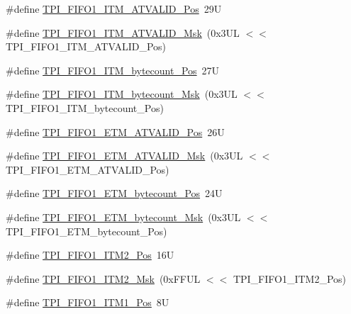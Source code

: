 \begin{DoxyCompactItemize}
\item 
\#define \mbox{\hyperlink{group___c_m_s_i_s___t_p_i_ga08edfc862b2c8c415854cc4ae2067dfb}{T\+P\+I\+\_\+\+F\+I\+F\+O1\+\_\+\+I\+T\+M\+\_\+\+A\+T\+V\+A\+L\+I\+D\+\_\+\+Pos}}~29U
\item 
\#define \mbox{\hyperlink{group___c_m_s_i_s___t_p_i_gabc1f6a3b6cac0099d7c01ca949b4dd08}{T\+P\+I\+\_\+\+F\+I\+F\+O1\+\_\+\+I\+T\+M\+\_\+\+A\+T\+V\+A\+L\+I\+D\+\_\+\+Msk}}~(0x3\+U\+L $<$$<$ T\+P\+I\+\_\+\+F\+I\+F\+O1\+\_\+\+I\+T\+M\+\_\+\+A\+T\+V\+A\+L\+I\+D\+\_\+\+Pos)
\item 
\#define \mbox{\hyperlink{group___c_m_s_i_s___t_p_i_gaa22ebf7c86e4f4b2c98cfd0b5981375a}{T\+P\+I\+\_\+\+F\+I\+F\+O1\+\_\+\+I\+T\+M\+\_\+bytecount\+\_\+\+Pos}}~27U
\item 
\#define \mbox{\hyperlink{group___c_m_s_i_s___t_p_i_gacba2edfc0499828019550141356b0dcb}{T\+P\+I\+\_\+\+F\+I\+F\+O1\+\_\+\+I\+T\+M\+\_\+bytecount\+\_\+\+Msk}}~(0x3\+U\+L $<$$<$ T\+P\+I\+\_\+\+F\+I\+F\+O1\+\_\+\+I\+T\+M\+\_\+bytecount\+\_\+\+Pos)
\item 
\#define \mbox{\hyperlink{group___c_m_s_i_s___t_p_i_ga3177b8d815cf4a707a2d3d3d5499315d}{T\+P\+I\+\_\+\+F\+I\+F\+O1\+\_\+\+E\+T\+M\+\_\+\+A\+T\+V\+A\+L\+I\+D\+\_\+\+Pos}}~26U
\item 
\#define \mbox{\hyperlink{group___c_m_s_i_s___t_p_i_ga0e8f29a1e9378d1ceb0708035edbb86d}{T\+P\+I\+\_\+\+F\+I\+F\+O1\+\_\+\+E\+T\+M\+\_\+\+A\+T\+V\+A\+L\+I\+D\+\_\+\+Msk}}~(0x3\+U\+L $<$$<$ T\+P\+I\+\_\+\+F\+I\+F\+O1\+\_\+\+E\+T\+M\+\_\+\+A\+T\+V\+A\+L\+I\+D\+\_\+\+Pos)
\item 
\#define \mbox{\hyperlink{group___c_m_s_i_s___t_p_i_gaab31238152b5691af633a7475eaf1f06}{T\+P\+I\+\_\+\+F\+I\+F\+O1\+\_\+\+E\+T\+M\+\_\+bytecount\+\_\+\+Pos}}~24U
\item 
\#define \mbox{\hyperlink{group___c_m_s_i_s___t_p_i_gab554305459953b80554fdb1908b73291}{T\+P\+I\+\_\+\+F\+I\+F\+O1\+\_\+\+E\+T\+M\+\_\+bytecount\+\_\+\+Msk}}~(0x3\+U\+L $<$$<$ T\+P\+I\+\_\+\+F\+I\+F\+O1\+\_\+\+E\+T\+M\+\_\+bytecount\+\_\+\+Pos)
\item 
\#define \mbox{\hyperlink{group___c_m_s_i_s___t_p_i_ga1828c228f3940005f48fb8dd88ada35b}{T\+P\+I\+\_\+\+F\+I\+F\+O1\+\_\+\+I\+T\+M2\+\_\+\+Pos}}~16U
\item 
\#define \mbox{\hyperlink{group___c_m_s_i_s___t_p_i_gae54512f926ebc00f2e056232aa21d335}{T\+P\+I\+\_\+\+F\+I\+F\+O1\+\_\+\+I\+T\+M2\+\_\+\+Msk}}~(0x\+F\+F\+U\+L $<$$<$ T\+P\+I\+\_\+\+F\+I\+F\+O1\+\_\+\+I\+T\+M2\+\_\+\+Pos)
\item 
\#define \mbox{\hyperlink{group___c_m_s_i_s___t_p_i_gaece86ab513bc3d0e0a9dbd82258af49f}{T\+P\+I\+\_\+\+F\+I\+F\+O1\+\_\+\+I\+T\+M1\+\_\+\+Pos}}~8U
$$
\end{DoxyCompactItemize}
